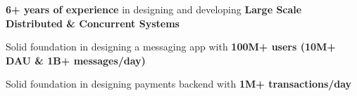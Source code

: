 
\begin{cventries}
  \cventry
    {} %
    {} %
    {} %
    {} %
    {
      \vspace{-6mm}
      \begin{cvitems} %
         \item {\textbf{6+ years of experience} in designing and developing \textbf{Large Scale Distributed \& Concurrent Systems}}
         \item {Solid foundation in designing a messaging app with \textbf{100M+ users (10M+ DAU \& 1B+ messages/day)}}
         \item {Solid foundation in designing payments backend with \textbf{1M+ transactions/day}}
      \end{cvitems}
    }
\end{cventries}
